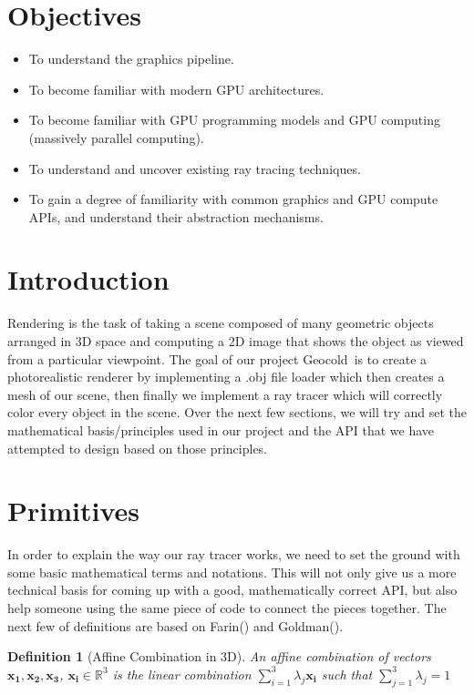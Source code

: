 \documentclass[a4paper, 12pt]{article}
\newcommand\PROJECTNAME{Geocold}
\newtheorem{definition}{Definition}
\begin{document}
\section{Objectives}
\begin{itemize}
	\item To understand the graphics pipeline.
	\item To become familiar with modern GPU architectures.
	\item To become familiar with GPU programming models and GPU computing (massively parallel computing).
	\item To understand and uncover existing ray tracing techniques.
	\item To gain a degree of familiarity with common graphics and GPU compute APIs, 
	and understand their abstraction mechanisms.
\end{itemize}

\section{Introduction}
	

Rendering is the task of taking a scene composed of many geometric 
objects arranged in 3D space and computing a 2D image that shows the object 
as viewed from a particular viewpoint. The goal of our project \PROJECTNAME~is to create 
a photorealistic renderer by implementing a .obj file loader which then 
creates a mesh of our scene, then finally we implement a ray tracer 
which will correctly color every object in the scene. 
Over the next few sections, we will try and set the mathematical 
basis/principles used in our project and the API that we have attempted to 
design based on those principles.

\section{Primitives}
In order to explain the way our ray tracer works, we need to 
set the ground with some basic mathematical 
terms and notations. This will not only give us a more 
technical basis for coming up with a good, mathematically 
correct API, but also help someone using the same 
piece of code to connect the pieces together. The next few of definitions are based on 
Farin(\cite{farin}) and Goldman(\cite{Goldman1985IllicitEI}).

\begin{definition}[Affine Combination in 3D]
	An affine combination of vectors $\bm{x_{1}}, \bm{x_{2}}, \bm{x_{3}}$, 
	$\bm{x_{i}}\in \mathbb{R}^{3}$
	is the linear combination $\sum_{i=1}^{3}\lambda_{j}\bm{x_{i}}$ such that
	$\sum_{j=1}^{3}\lambda_{j}=1$
\end{definition}
\end{document}
